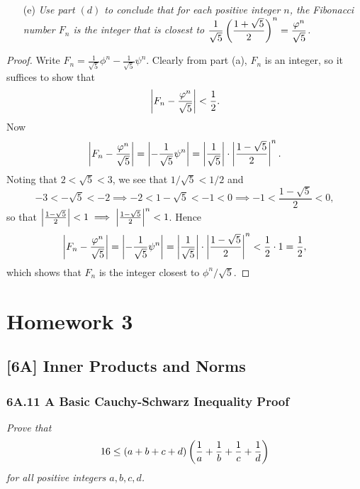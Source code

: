 \documentclass{article}
\begin{document}
\begin{itemize}
    \item[(e)] \textit{Use part $(d)$ to conclude that for each positive integer $n$, the Fibonacci number $F_n$ is the integer that is closest to $\displaystyle\frac 1{\sqrt 5}\left(\frac{1+\sqrt 5}2 \right)^n = \frac {\varphi^n}{\sqrt 5}$.}
\end{itemize}
\begin{proof}
Write $F_n = \frac 1{\sqrt 5}\phi^n - \frac 1{\sqrt 5}\psi^n$. Clearly from part (a), $F_n$ is an integer, so it suffices to show that
$$\left|F_n - \frac{\varphi^n}{\sqrt 5}\right| < \frac 12.$$
Now
$$\left|F_n - \frac{\varphi^n}{\sqrt 5}\right| = \left|-\frac 1{\sqrt 5}\psi^n\right| = \left|\frac 1{\sqrt 5}\right|\cdot \left|\frac{1-\sqrt 5}2\right|^n.$$
Noting that $2 < \sqrt 5 < 3$, we see that $1/\sqrt 5 < 1/2$ and
$$-3<-\sqrt 5 < -2\implies -2<1-\sqrt 5 < -1<0 \implies -1 < \frac{1-\sqrt 5}{2} < 0,$$
so that $\left|\frac{1-\sqrt 5}2\right| < 1 \implies \left|\frac{1-\sqrt 5}2\right|^n < 1$. Hence
$$\left|F_n - \frac{\varphi^n}{\sqrt 5}\right| = \left|-\frac 1{\sqrt 5}\psi^n\right| = \left|\frac 1{\sqrt 5}\right|\cdot \left|\frac{1-\sqrt 5}2\right|^n < \frac 12\cdot 1 = \frac 12,$$
which shows that $F_n$ is the integer closest to $\phi^n/\sqrt 5$.
\end{proof}
\section*{Homework 3}
\subsection*{[6A] Inner Products and Norms}
\subsubsection*{6A.11 A Basic Cauchy-Schwarz Inequality Proof}
\textit{Prove that $$16 \leq (a+b+c+d)\left(\frac 1a + \frac 1b + \frac 1c + \frac 1d \right)$$ for all positive integers $a,b,c,d$.}
\end{document}
